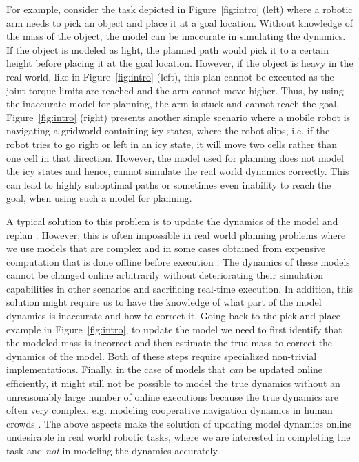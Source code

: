 For example, consider the task depicted in Figure~\ref{fig:intro}
(left) where a robotic arm needs to pick an object and place it at a
goal location. Without knowledge of the mass of the object, the model
can be inaccurate in simulating the dynamics. If the object is modeled
as light, the planned 
path would pick it to a certain height before placing it at the
goal location. However, if the object is heavy in the real world, like
in Figure~\ref{fig:intro} (left), this plan cannot be executed as the
joint torque limits are reached and the arm cannot move higher. Thus, by
using the inaccurate model for planning, the arm is stuck and cannot reach the
goal. Figure~\ref{fig:intro} (right) presents another simple scenario
where a mobile robot is navigating a gridworld containing icy
states, where the robot slips, i.e.
if the robot tries to go right or left in an icy state, it will move two cells rather
than one cell in that direction. However, the model used for planning
does not model the icy states and hence, cannot
simulate the real world dynamics correctly. This can lead to highly
suboptimal paths or sometimes even inability to reach the goal, when using such a model for planning.

A typical solution to this problem is to update the dynamics of the
model and replan \cite{DBLP:journals/sigart/Sutton91}. However, this
is often impossible in real world planning problems 
where we use models that are complex and in some cases obtained from
expensive computation that is done offline before execution
\cite{DBLP:conf/wafr/HauserBHL06}. The
dynamics of these models cannot be changed online arbitrarily without
deteriorating their simulation capabilities in other scenarios and sacrificing
real-time execution. In addition, this solution might require us to have
the knowledge of what part of the model dynamics is inaccurate and
how to correct it. Going
back to the pick-and-place example in Figure~\ref{fig:intro}, to
update the model we need to first identify
that the modeled mass is incorrect and then estimate the true mass to
correct the dynamics of the model. Both of these steps require
specialized non-trivial implementations. Finally, in the case of models that
\emph{can} be updated online efficiently, it might still not be possible to
model the true dynamics without an unreasonably large number of online
executions because the true dynamics are
often very complex, e.g. modeling cooperative navigation dynamics in
human crowds \cite{DBLP:conf/icra/VemulaMO17}. The above aspects make the 
solution of updating model dynamics online undesirable in real world robotic
tasks, where we are interested in completing the task and \emph{not} in
modeling the dynamics accurately.

